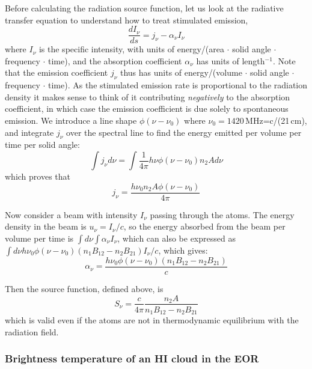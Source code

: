 {Before calculating the radiation source function, let us look at the radiative transfer equation to understand how to treat stimulated emission,
\begin{equation}
\frac{dI_\nu}{ds}=j_\nu-\alpha_\nu I_\nu
\end{equation}
where $I_\nu$ is the specific intensity, with units of energy/(area $\cdot$ solid angle $\cdot$ frequency $\cdot$ time), and the absorption coefficient $\alpha_\nu$ has units of length$^{-1}$. Note that the emission coefficient $j_\nu$ thus has units of energy/(volume $\cdot$ solid angle $\cdot$ frequency $\cdot$ time). As the stimulated emission rate is proportional to the radiation density it makes sense to think of it contributing \textit{negatively} to the absorption coefficient, in which case the emission coefficient is due solely to spontaneous emission. We introduce a line shape $\phi(\nu-\nu_0)$ where $\nu_0=1420$\,MHz=c/(21\,cm), and integrate $j_\nu$ over the spectral line to find the energy emitted per volume per time per solid angle:
\begin{equation}
\int j_\nu d\nu=\int\frac{1}{4\pi}h\nu\phi(\nu-\nu_0) n_2 Ad\nu
\end{equation}
which proves that
\begin{equation}
j_\nu=\frac{h\nu_0 n_2A\phi(\nu-\nu_0)}{4\pi}
\end{equation}

Now consider a beam with intensity $I_\nu$ passing through the atoms. The energy density in the beam is $u_\nu=I_\nu/c$, so the energy absorbed from the beam per volume per time is $\int d\nu\int\alpha_\nu I_\nu$, which can also be expressed as $\int d\nu h\nu_0\phi(\nu-\nu_0)(n_1B_{12}-n_2B_{21})I_\nu/c$, which gives:
\begin{equation}
\alpha_\nu=\frac{h\nu_0\phi(\nu-\nu_0)(n_1B_{12}-n_2B_{21})}{c}
\end{equation}

Then the source function, defined above, is
\begin{equation}
S_\nu=\frac{c}{4\pi}\frac{ n_2A}{n_1B_{12}-n_2B_{21}}
\end{equation}
which is valid even if the atoms are not in thermodynamic equilibrium with the radiation field. 

\subsubsection{Brightness temperature of an HI cloud in the EOR}

}
